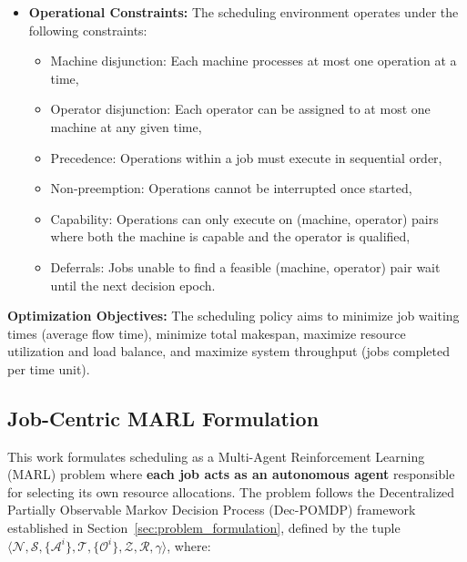 \begin{itemize}
\item \textbf{Operational Constraints:}
The scheduling environment operates under the following constraints:
\begin{itemize}
    \item Machine disjunction: Each machine processes at most one operation at a time,
    \item Operator disjunction: Each operator can be assigned to at most one machine at any given time,
    \item Precedence: Operations within a job must execute in sequential order,
    \item Non-preemption: Operations cannot be interrupted once started,
    \item Capability: Operations can only execute on (machine, operator) pairs where both the machine is capable and the operator is qualified,
    \item Deferrals: Jobs unable to find a feasible (machine, operator) pair wait until the next decision epoch.
\end{itemize}
\end{itemize}

\textbf{Optimization Objectives:}
The scheduling policy aims to minimize job waiting times (average flow time), minimize total makespan, maximize resource utilization and load balance, and maximize system throughput (jobs completed per time unit).

\subsection{Job-Centric MARL Formulation}

This work formulates scheduling as a Multi-Agent Reinforcement Learning (MARL) problem where \textbf{each job acts as an autonomous agent} responsible for selecting its own resource allocations. The problem follows the Decentralized Partially Observable Markov Decision Process (Dec-POMDP) framework established in Section~\ref{sec:problem_formulation}, defined by the tuple \( \langle \mathcal{N}, \mathcal{S}, \{\mathcal{A}^i\}, \mathcal{T}, \{\mathcal{O}^i\}, \mathcal{Z}, \mathcal{R}, \gamma \rangle \), where:

